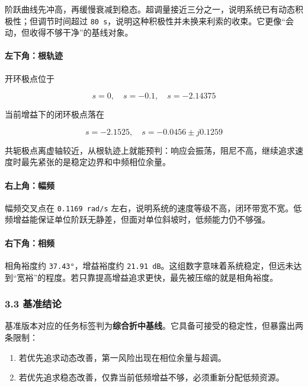 \documentclass[
  11pt]{article}
\providecommand{\tightlist}{%
  \setlength{\itemsep}{0pt}\setlength{\parskip}{0pt}}
\begin{document}
阶跃曲线先冲高，再缓慢衰减到稳态。超调量接近三分之一，说明系统已有动态积极性；但调节时间超过
\texttt{80\ s}，说明这种积极性并未换来利索的收束。它更像``会动，但收得不够干净''的基线对象。

\paragraph{左下角：根轨迹}\label{ux5de6ux4e0bux89d2ux6839ux8f68ux8ff9}

开环极点位于

\[
s=0,\quad s=-0.1,\quad s=-2.14375
\]

当前增益下的闭环极点落在

\[
s=-2.1525,\quad s=-0.0456 \pm j0.1259
\]

共轭极点离虚轴较近，从根轨迹上就能预判：响应会振荡，阻尼不高，继续追求速度时最先紧张的是稳定边界和中频相位余量。

\paragraph{右上角：幅频}\label{ux53f3ux4e0aux89d2ux5e45ux9891}

幅频交叉点在 \texttt{0.1169\ rad/s}
左右，说明系统的速度等级不高，闭环带宽不宽。低频增益能保证单位阶跃无静差，但面对单位斜坡时，低频能力仍不够强。

\paragraph{右下角：相频}\label{ux53f3ux4e0bux89d2ux76f8ux9891}

相角裕度约 \texttt{37.43°}，增益裕度约
\texttt{21.91\ dB}。这组数字意味着系统稳定，但远未达到``宽裕''的程度。若只靠提高增益追求更快，最先被压缩的就是相角裕度。

\subsubsection{3.3 基准结论}\label{ux57faux51c6ux7ed3ux8bba}

基准版本对应的任务标签判为\textbf{综合折中基线}。它具备可接受的稳定性，但暴露出两条限制：

\begin{enumerate}
\def\labelenumi{\arabic{enumi}.}
\tightlist
\item
  若优先追求动态改善，第一风险出现在相位余量与超调。
\item
  若优先追求稳态改善，仅靠当前低频增益不够，必须重新分配低频资源。
\end{enumerate}
\end{document}
